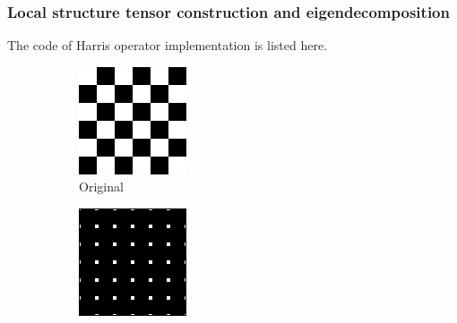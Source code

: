 \subsubsection{Local structure tensor construction and eigendecomposition}
The code of Harris operator implementation is listed here.



\begin{figure}[htbp]
	\centering
	\begin{subfigure}[t]{0.3\textwidth}
	    \centering
		\includegraphics[width=\textwidth]{hw2/problem3/checkerboard.png}
		\caption{Original}\label{fig:5a}
	\end{subfigure}
	\begin{subfigure}[t]{0.3\textwidth}
	    \centering
		\includegraphics[width=\textwidth]{hw2/problem3/response_checkerboard.png}

\end{subfigure}
\end{figure}
